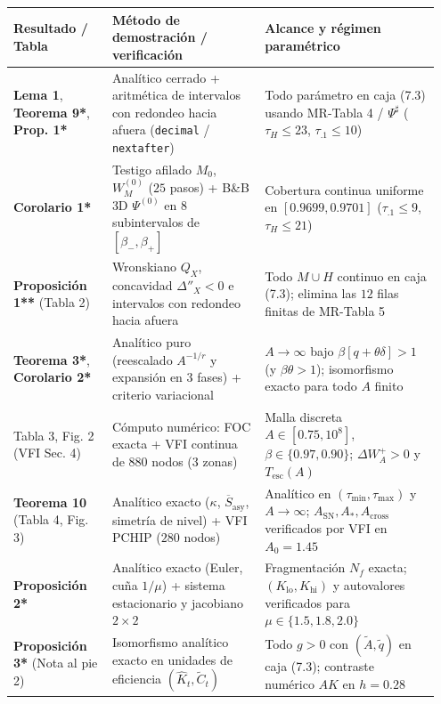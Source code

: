 \documentclass[11pt,letterpaper]{article}
\theoremstyle{plain}
\begin{document}
\begin{table}[htbp]
\centering
\scriptsize
\setlength{\tabcolsep}{4pt}
\begin{tabular}{@{}p{0.22\linewidth}p{0.34\linewidth}p{0.39\linewidth}@{}}
\toprule
\textbf{Resultado / Tabla} & \textbf{Método de demostración / verificación} & \textbf{Alcance y régimen paramétrico} \\
\midrule
\textbf{Lema 1}, \textbf{Teorema 9*}, \textbf{Prop. 1*} & Analítico cerrado + aritmética de intervalos con redondeo hacia afuera (\texttt{decimal} / \texttt{nextafter}) & Todo parámetro en caja (7.3) usando MR-Tabla 4 / $\Psi^\sharp$ ($\tau_H\le 23$, $\tau_{.1}\le 10$) \\
\textbf{Corolario 1*} & Testigo afilado $M_0$, $W_M^{(0)}$ ($25$ pasos) + B\&B 3D $\Psi^{(0)}$ en $8$ subintervalos de $[\beta_-,\beta_+]$ & Cobertura continua uniforme en $[0.9699,0.9701]$ ($\tau_{.1}\le 9$, $\tau_H\le 21$) \\
\textbf{Proposición 1**} (Tabla 2) & Wronskiano $Q_X$, concavidad $\Delta''_X<0$ e intervalos con redondeo hacia afuera & Todo $M\cup H$ continuo en caja (7.3); elimina las $12$ filas finitas de MR-Tabla 5 \\
\textbf{Teorema 3*}, \textbf{Corolario 2*} & Analítico puro (reescalado $A^{-1/r}$ y expansión en $3$ fases) + criterio variacional & $A\to\infty$ bajo $\beta[q+\theta\delta]>1$ (y $\beta\theta>1$); isomorfismo exacto para todo $A$ finito \\
Tabla 3, Fig. 2 (VFI Sec. 4) & Cómputo numérico: FOC exacta + VFI continua de $880$ nodos ($3$ zonas) & Malla discreta $A\in[0.75,10^8]$, $\beta\in\{0.97,0.90\}$; $\Delta W_A^+>0$ y $T_{\mathrm{esc}}(A)$ \\
\textbf{Teorema 10} (Tabla 4, Fig. 3) & Analítico exacto ($\kappa$, $\overline{S}_{\mathrm{asy}}$, simetría de nivel) + VFI PCHIP ($280$ nodos) & Analítico en $(\tau_{\min},\tau_{\max})$ y $A\to\infty$; $A_{\mathrm{SN}}, A_*, A_{\mathrm{cross}}$ verificados por VFI en $A_0=1.45$ \\
\textbf{Proposición 2*} & Analítico exacto (Euler, cuña $1/\mu$) + sistema estacionario y jacobiano $2\times 2$ & Fragmentación $N_f$ exacta; $(K_{\mathrm{lo}},K_{\mathrm{hi}})$ y autovalores verificados para $\mu\in\{1.5,1.8,2.0\}$ \\
\textbf{Proposición 3*} (Nota al pie 2) & Isomorfismo analítico exacto en unidades de eficiencia $(\hat{K}_t,\tilde{C}_t)$ & Todo $g>0$ con $(\tilde{A},\tilde{q})$ en caja (7.3); contraste numérico $AK$ en $h=0.28$ \\

\end{tabular}
\end{table}
\end{document}
